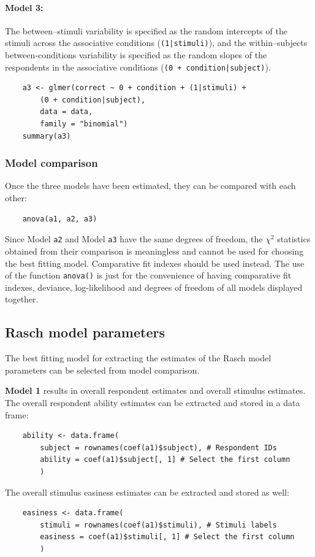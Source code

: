 \documentclass[12pt]{book}
\begin{document}
\paragraph*{Model 3:}  
The between--stimuli variability is specified as the random intercepts of the stimuli across the associative conditions (\texttt{(1|stimuli)}), and  the within--subjects between-conditions variability is specified as the random slopes of the respondents in the associative conditions (\texttt{(0 + condition|subject)}).
%
\begin{lstlisting}
	a3 <- glmer(correct ~ 0 + condition + (1|stimuli) + 
		(0 + condition|subject), 
		data = data, 
		family = "binomial")
	summary(a3) 
\end{lstlisting}


\subsubsection{Model comparison}

Once the three models have been estimated, they can be compared with each other:
%
\begin{lstlisting}
	anova(a1, a2, a3)
\end{lstlisting}
Since Model \texttt{a2} and Model \texttt{a3} have the same degrees of freedom, the $\chi^2$ statistics obtained from their comparison is  meaningless and cannot be used for choosing the best fitting model. Comparative fit indexes should be used instead. 
The use of the function \texttt{anova()} is just for the convenience of having comparative fit indexes, deviance, log-likelihood and degrees of freedom of all models displayed together.

\subsection{Rasch model parameters}
The best fitting model for extracting the estimates of the Rasch model parameters can be selected from model comparison. 

\textbf{Model 1} results in overall respondent estimates and overall stimulus estimates. The overall respondent ability estimates can be extracted and stored in a data frame: 
%
\begin{lstlisting}
	ability <- data.frame(
		subject = rownames(coef(a1)$subject), # Respondent IDs
		ability = coef(a1)$subject[, 1] # Select the first column
		)		
\end{lstlisting}
The overall stimulus easiness estimates can be extracted and stored as well: 
%
\begin{lstlisting}
	easiness <- data.frame(
		stimuli = rownames(coef(a1)$stimuli), # Stimuli labels
		easiness = coef(a1)$stimuli[, 1] # Select the first column
		)
\end{lstlisting}
\end{document}
